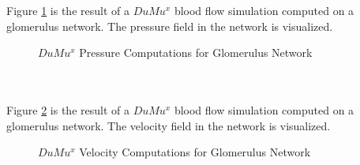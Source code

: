 Figure \ref{fig:glom2_pressure}  is the result of a $DuMu^x$ blood flow simulation computed on a glomerulus network. The pressure field in the network is visualized.\\
\begin{figure}[h]
\caption{\footnotesize $DuMu^x$ Pressure Computations for Glomerulus Network}
\label{fig:glom2_pressure}
\end{figure}\\
%
\\Figure \ref{fig:glom2_velocity}  is the result of a $DuMu^x$ blood flow simulation computed on a glomerulus network. The velocity field in the network is visualized.\\
\begin{figure}[h]
\caption{\footnotesize $DuMu^x$ Velocity Computations for Glomerulus Network}
\label{fig:glom2_velocity}
\end{figure}\\\\


